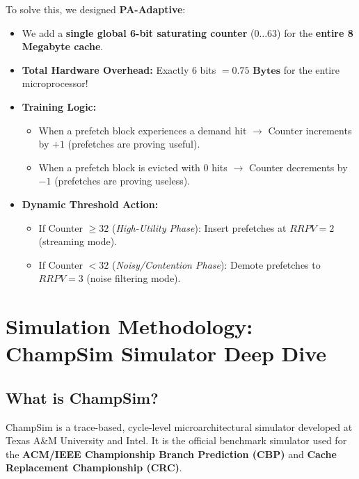 \documentclass[11pt, a4paper]{article}
\begin{document}
To solve this, we designed \textbf{PA-Adaptive}:
\begin{itemize}[leftmargin=1.5em]
  \item We add a \textbf{single global 6-bit saturating counter} ($0 \dots 63$) for the \textbf{entire 8 Megabyte cache}.
  \item \textbf{Total Hardware Overhead:} Exactly 6 bits $= \mathbf{0.75 \text{ Bytes}}$ for the entire microprocessor!
  \item \textbf{Training Logic:}
  \begin{itemize}
    \item When a prefetch block experiences a demand hit $\rightarrow$ Counter increments by $+1$ (prefetches are proving useful).
    \item When a prefetch block is evicted with 0 hits $\rightarrow$ Counter decrements by $-1$ (prefetches are proving useless).
  \end{itemize}
  \item \textbf{Dynamic Threshold Action:}
  \begin{itemize}
    \item If Counter $\ge 32$ (\textit{High-Utility Phase}): Insert prefetches at $RRPV = 2$ (streaming mode).
    \item If Counter $< 32$ (\textit{Noisy/Contention Phase}): Demote prefetches to $RRPV = 3$ (noise filtering mode).
  \end{itemize}
\end{itemize}

\newpage

\section{Simulation Methodology: ChampSim Simulator Deep Dive}

\subsection{What is ChampSim?}
ChampSim is a trace-based, cycle-level microarchitectural simulator developed at Texas A\&M University and Intel. It is the official benchmark simulator used for the \textbf{ACM/IEEE Championship Branch Prediction (CBP)} and \textbf{Cache Replacement Championship (CRC)}.
\end{document}
